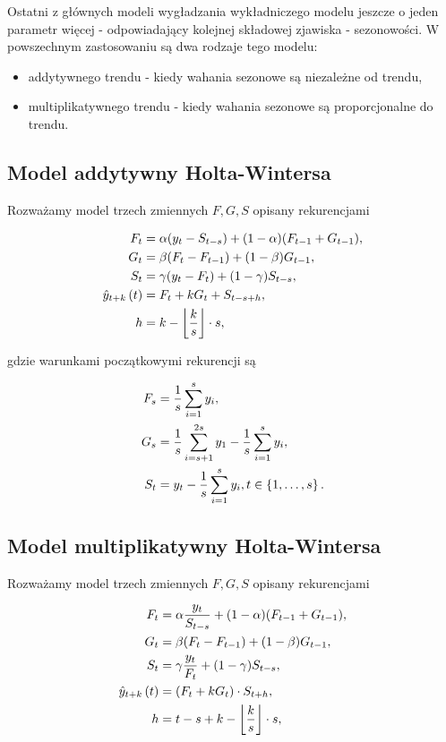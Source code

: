 \documentclass[10pt,a4paper]{book}
\begin{document}
Ostatni z głównych modeli wygładzania wykładniczego modelu jeszcze o jeden parametr więcej - odpowiadający kolejnej składowej zjawiska - sezonowości. W powszechnym zastosowaniu są dwa rodzaje tego modelu:
\begin{itemize}
\item addytywnego trendu - kiedy wahania sezonowe są niezależne od trendu,
\item multiplikatywnego trendu - kiedy wahania sezonowe są proporcjonalne do trendu.
\end{itemize}

\subsection{Model addytywny Holta-Wintersa}

Rozważamy model trzech zmiennych $F, G, S$ opisany rekurencjami

\begin{align*}
F_t &= \alpha (y_t - S_{t-s}) + (1-\alpha) ( F_{t-1} + G_{t-1} ), \\
G_t &= \beta (F_t - F_{t-1}) + (1-\beta) G_{t-1},\\
S_t &= \gamma (y_t - F_t) + (1-\gamma) S_{t-s},\\ 
\predict[t]{y}{t+k}&= F_t + k G_t + S_{t-s+h},\\
h &= k - \left\lfloor \frac{k}{s} \right\rfloor \cdot s,
\end{align*} 

gdzie warunkami początkowymi rekurencji są 

\begin{align*}
F_s &= \frac{1}{s} \sum_{i=1}^{s} y_i,\\
G_s &= \frac{1}{s} \sum_{i=s+1}^{2s} y_1 - \frac{1}{s} \sum_{i=1}^{s} y_i,\\
S_t &= y_t - \frac{1}{s} \sum_{i=1}^{s} y_i, t \in \set{1,\ldots,s}.
\end{align*}

\subsection{Model multiplikatywny Holta-Wintersa}

Rozważamy model  trzech zmiennych $F, G, S$ opisany rekurencjami

\begin{align*}
F_t &= \alpha \frac{y_t}{S_{t-s}} + (1-\alpha) ( F_{t-1} + G_{t-1} ), \\
G_t &= \beta (F_t - F_{t-1}) + (1-\beta) G_{t-1},\\
S_t &= \gamma \frac{y_t}{F_t} + (1-\gamma) S_{t-s},\\ 
\predict[t]{y}{t+k}&= \bracket{F_t + k G_t} \cdot S_{t+h},\\
h &= t-s + k - \left\lfloor \frac{k}{s} \right\rfloor \cdot s,
\end{align*} 
\end{document}
